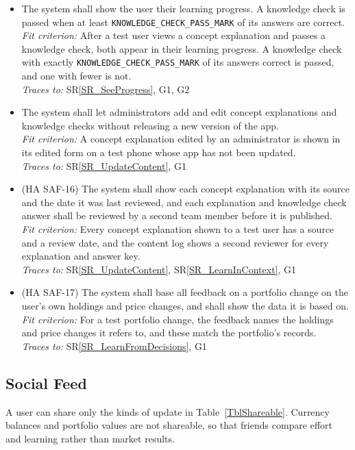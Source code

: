 \documentclass[12pt]{article}
\newcommand{\srref}[1]{SR\ref{#1}}
\newcounter{reqnum} %
\newcommand{\freq}[4]{%
  \item[FR\refstepcounter{reqnum}\thereqnum \label{#1}:] #2\\
  \textit{Fit criterion:} #3\\
  \textit{Traces to:} #4}
\begin{document}
\begin{itemize}
  {A test user who answers one question wrongly sees that question marked
  incorrect, together with the explanation of its correct answer.}
  {\srref{SR_LearnFromDecisions}, G1}
\freq{FR_LearnProgress}
  {The system shall show the user their learning progress. A knowledge check is
  passed when at least \texttt{KNOWLEDGE\_CHECK\_\allowbreak PASS\_MARK} of its
  answers are correct.}
  {After a test user views a concept explanation and passes a knowledge check,
  both appear in their learning progress. A knowledge check with exactly
  \texttt{KNOWLEDGE\_CHECK\_\allowbreak PASS\_MARK} of its answers correct is
  passed, and one with fewer is not.}
  {\srref{SR_SeeProgress}, G1, G2}
\freq{FR_LearnUpdateContent}
  {The system shall let administrators add and edit concept explanations and
  knowledge checks without releasing a new version of the app.}
  {A concept explanation edited by an administrator is shown in its edited form
  on a test phone whose app has not been updated.}
  {\srref{SR_UpdateContent}, G1}
\freq{FR_LearnReviewed}
  {(HA SAF-16) The system shall show each concept explanation with its source
  and the date it was last reviewed, and each explanation and knowledge check
  answer shall be reviewed by a second team member before it is published.}
  {Every concept explanation shown to a test user has a source and a review
  date, and the content log shows a second reviewer for every explanation and
  answer key.}
  {\srref{SR_UpdateContent}, \srref{SR_LearnInContext}, G1}
\freq{FR_LearnFeedbackBasis}
  {(HA SAF-17) The system shall base all feedback on a portfolio change on the
  user's own holdings and price changes, and shall show the data it is based
  on.}
  {For a test portfolio change, the feedback names the holdings and price
  changes it refers to, and these match the portfolio's records.}
  {\srref{SR_LearnFromDecisions}, G1}
\end{itemize}

\subsection{Social Feed}

A user can share only the kinds of update in Table~\ref{TblShareable}. Currency
balances and portfolio values are not shareable, so that friends compare
effort and learning rather than market results.
\end{document}
